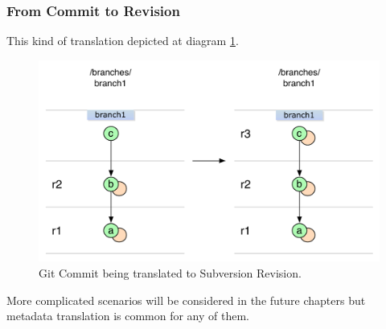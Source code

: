 \subsubsection{From Commit to Revision}

This kind of translation depicted at diagram \ref{single_change_git_to_svn}.

\begin{figure}[!h]
\centering
\includegraphics[width=\linewidth]{img/diagrams/single_change_git_to_svn.pdf}
\caption{Git Commit being translated to Subversion Revision.}
\label{single_change_git_to_svn}
\end{figure}

More complicated scenarios will be considered in the future chapters but metadata translation is common for any of them.